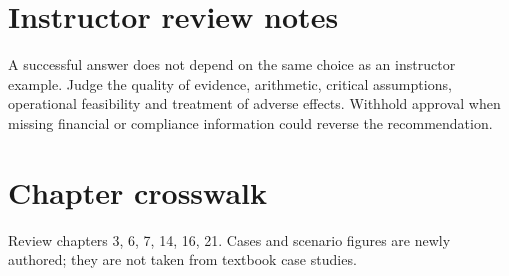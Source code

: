 \documentclass[11pt]{article}
\begin{document}
\section{Instructor review notes}
A successful answer does not depend on the same choice as an instructor example. Judge the quality of evidence, arithmetic, critical assumptions, operational feasibility and treatment of adverse effects. Withhold approval when missing financial or compliance information could reverse the recommendation.
\section{Chapter crosswalk}
Review chapters 3, 6, 7, 14, 16, 21. Cases and scenario figures are newly authored; they are not taken from textbook case studies.
\end{document}
